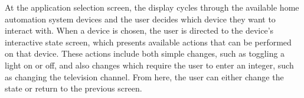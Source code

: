 \documentclass[landscape,a0paper,fontscale=0.285]{baposter} %
\begin{document}
\begin{poster}
{At the application selection screen, the display cycles through the available
home automation system devices and the user decides which device they want to
interact with. When a device is chosen, the user is directed to the device's
interactive state screen, which presents available actions that can be
performed on that device. These actions include both simple changes, such as
toggling a light on or off, and also changes which require the user to enter
an integer, such as changing the television channel. From here, the user can
either change the state or return to the previous screen.

}






\end{poster}
\end{document}
